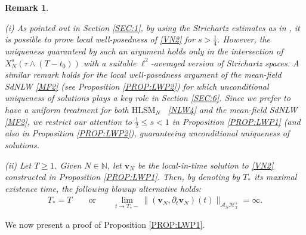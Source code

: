 \documentclass[letterpaper, 11pt,  reqno]{amsart}
\newtheorem{remark}[theorem]{Remark}
\newcommand{\1}{\hspace{0.5mm}\text{I}\hspace{0.2mm}}
\newcommand{\noi}{\noindent}
\newcommand{\N}{\mathbb{N}}
\renewcommand{\H}{\mathcal{H}}
\newcommand{\dt}{\partial_t}
\newcommand{\A}{\mathcal{A}}
\newcommand{\HLS}{$\text{HLSM}_N$ }
\newcommand{\vv}{\mathbf{v}}
\renewcommand{\l}{\ell}
\numberwithin{equation}{section}
\numberwithin{theorem}{section}
\begin{document}
\begin{remark}
\label{REM:LWP1} \rm


(i)
As pointed out in Section \ref{SEC:1}, 
by using the Strichartz estimates as in \cite{GKO}, 
it is possible to prove local well-posedness
of \eqref{VN2} for $s > \frac 14$.
However, the uniqueness guaranteed
by such an argument holds
only in the intersection of 
$X^s_N(\tau\wedge (T - t_0))$
with a suitable $\l^2$-averaged version
of Strichartz spaces.
A similar remark holds for 
the local well-posedness argument 
of the mean-field SdNLW \eqref{MF2} (see Proposition \ref{PROP:LWP2})
for which 
 unconditional uniqueness
of  solutions
plays a key role in Section \ref{SEC:6}.
Since we prefer to have a uniform treatment
for both \HLS~\eqref{NLW4}
and 
the mean-field SdNLW \eqref{MF2}, 
we restrict our attention to $\frac 12 \le s < 1$
in  
Proposition \ref{PROP:LWP1}
(and also in Proposition \ref{PROP:LWP2}), 
 guaranteeing
unconditional uniqueness of solutions. 

 
 
\smallskip

\noi
(ii) Let $T \ge 1$.
Given $N \in \N$, 
let $\vv_N$ be the local-in-time solution 
to \eqref{VN2} constructed in Proposition \ref{PROP:LWP1}.
Then, 
by denoting by $T_*$ its maximal existence time, 
the following blowup alternative holds:
\begin{align}
T_* = T\qquad \text{or}\qquad 
\lim_{t \to T_*-}
\| (\vv_N, \dt \vv_N)(t)\|_{\A_{N} \H^s_x}
= \infty.
\label{blow1}
\end{align}


 
\end{remark}



We now present a proof of 
Proposition \ref{PROP:LWP1}.
\end{document}

